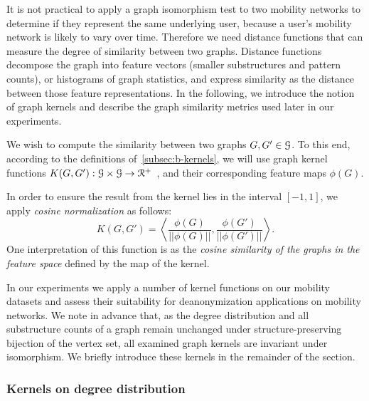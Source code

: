 It is not practical to apply a graph isomorphism test to two mobility networks to determine if they represent the same underlying user, because a user's mobility network is likely to vary over time.
Therefore we need distance functions that can measure the degree of similarity between two graphs.
Distance functions decompose the graph into feature vectors (smaller substructures and pattern counts), or histograms of graph statistics, and express similarity as the distance between those feature representations.
In the following, we introduce the notion of graph kernels and describe the graph similarity metrics used later in our experiments.

We wish to compute the similarity between two graphs $ G, G' \in \mathcal{G}$. 
To this end, according to the definitions of~\cref{subsec:b-kernels}, we will use graph kernel functions $ K(G, G') : \mathcal{G} \times \mathcal{G} \rightarrow \mathcal{R}^{+}$~\cite{Vishwanathan2010}, and their corresponding feature maps $\phi(G)$.

In order to ensure the result from the kernel lies in the interval $[-1, 1]$, we apply \emph{cosine normalization} as follows:
\[
K({G}, {G}')=\left  \langle \frac{\phi({G})}{||\phi({G})||}, \frac{\phi(G')}{||\phi(G')||} \right  \rangle.
\]
One interpretation of this function is as the \emph{cosine similarity of the graphs in the feature space} defined by the map of the kernel.

In our experiments we apply a number of kernel functions on our mobility datasets and assess their suitability for deanonymization applications on mobility networks.
We note in advance that, as the degree distribution and all substructure counts of a graph remain unchanged under structure-preserving bijection of the vertex set, all examined graph kernels are invariant under isomorphism.
We briefly introduce these kernels in the remainder of the section.


\subsubsection{Kernels on degree distribution }

